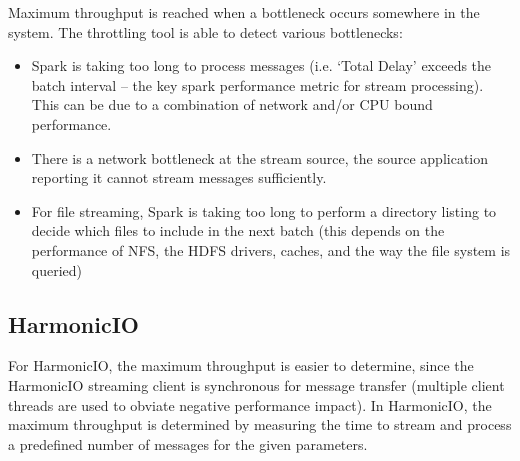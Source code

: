 \documentclass[conference]{IEEEtran}
\begin{document}

Maximum throughput is reached when a bottleneck occurs somewhere in the system. The throttling tool is able to detect various bottlenecks:
\begin{itemize}
\item Spark is taking too long to process messages (i.e. `Total Delay' exceeds the batch interval -- the key spark performance metric for stream processing). This can be due to a combination of network and/or CPU bound performance.
\item There is a network bottleneck at the stream source, the source application reporting it cannot stream messages sufficiently.%
\item For file streaming, Spark is taking too long to perform a directory listing to decide which files to include in the next batch (this depends on the performance of NFS, the HDFS drivers, caches, and the way the file system is queried) 
\end{itemize}





\subsection{HarmonicIO}

For HarmonicIO, the maximum throughput is easier to determine, since the HarmonicIO streaming client is synchronous for message transfer (multiple client threads are used to obviate negative performance impact).
In HarmonicIO, the maximum throughput is determined by measuring the time to stream and process a predefined number of messages for the given parameters.
\end{document}
